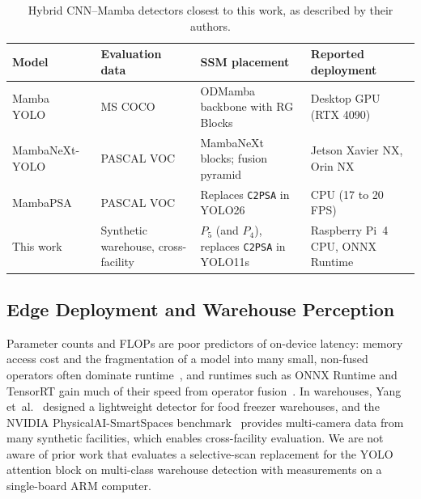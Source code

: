 \begin{table}[t]
\caption{Hybrid CNN--Mamba detectors closest to this work, as described by their authors.}
\label{tab:lit_comparison}
\centering
\footnotesize
\setlength{\tabcolsep}{3pt}
\begin{tabularx}{\textwidth}{>{\raggedright\arraybackslash}p{2.3cm} >{\raggedright\arraybackslash}p{2.1cm} >{\raggedright\arraybackslash}X >{\raggedright\arraybackslash}p{2.9cm}}
\toprule
\textbf{Model} & \textbf{Evaluation data} & \textbf{SSM placement} & \textbf{Reported deployment} \\
\midrule
Mamba YOLO~\cite{wang2025mambayolo} & MS COCO & ODMamba backbone with RG Blocks & Desktop GPU (RTX 4090) \\
MambaNeXt-YOLO~\cite{lei2025mambanext} & PASCAL VOC & MambaNeXt blocks; fusion pyramid & Jetson Xavier NX, Orin NX \\
MambaPSA~\cite{chan2026mambapsa} & PASCAL VOC & Replaces \texttt{C2PSA} in YOLO26 & CPU (17 to 20 FPS) \\
\midrule
This work & Synthetic warehouse, cross-facility & $P_5$ (and $P_4$), replaces \texttt{C2PSA} in YOLO11s & Raspberry Pi~4 CPU, ONNX Runtime \\
\bottomrule
\end{tabularx}
\end{table}

\subsection{Edge Deployment and Warehouse Perception}
Parameter counts and FLOPs are poor predictors of on-device latency: memory access cost and the fragmentation of a model into many small, non-fused operators often dominate runtime~\cite{ma2018shufflenetv2,mittal2024lightweightsurvey}, and runtimes such as ONNX Runtime and TensorRT gain much of their speed from operator fusion~\cite{ratul2024accelerating}. In warehouses, Yang et~al.~\cite{yang2024freezerwarehouse} designed a lightweight detector for food freezer warehouses, and the NVIDIA PhysicalAI-SmartSpaces benchmark~\cite{wang2026smartspaces} provides multi-camera data from many synthetic facilities, which enables cross-facility evaluation. We are not aware of prior work that evaluates a selective-scan replacement for the YOLO attention block on multi-class warehouse detection with measurements on a single-board ARM computer.

